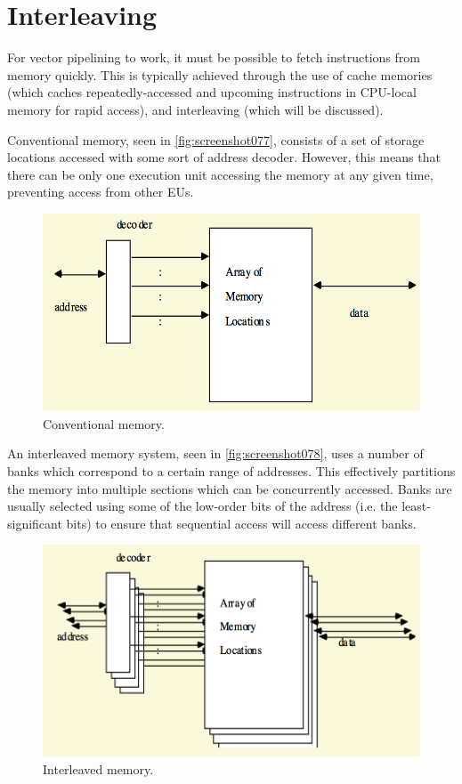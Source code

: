 \section{Interleaving}
For vector pipelining to work, it must be possible to fetch instructions from memory quickly. This is typically achieved through the use of cache memories (which caches repeatedly-accessed and upcoming instructions in CPU-local memory for rapid access), and interleaving (which will be discussed).

Conventional memory, seen in \autoref{fig:screenshot077}, consists of a set of storage locations accessed with some sort of address decoder. However, this means that there can be only one execution unit accessing the memory at any given time, preventing access from other EUs.

\begin{figure}
\centering
\includegraphics[width=0.5\linewidth]{figures/screenshot077}
\caption{Conventional memory.}
\label{fig:screenshot077}
\end{figure}

An interleaved memory system, seen in \autoref{fig:screenshot078}, uses a number of banks which correspond to a certain range of addresses. This effectively partitions the memory into multiple sections which can be concurrently accessed. Banks are usually selected using some of the low-order bits of the address (i.e. the least-significant bits) to ensure that sequential access will access different banks.

\begin{figure}
\centering
\includegraphics[width=0.7\linewidth]{figures/screenshot078}
\caption{Interleaved memory.}
\label{fig:screenshot078}
\end{figure}

